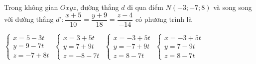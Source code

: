 \documentclass[12pt,a4paper]{article}
\begin{document}
\begin{ex}
 Trong không gian ${Oxyz}$, đường thẳng ${d}$ đi qua điểm ${N(-3;-7;8)}$ và song song với đường thẳng $d':\dfrac{x + 5}{10}=\dfrac{y + 9}{18}=\dfrac{z - 4}{-14}$ có phương trình là
 
\choice
{ $\left\{ \begin{array}{l}x = 5-3t\\ y = 9-7t\\z = -7+8t\end{array} \right.$ }
   { $\left\{ \begin{array}{l}x = 3+5t\\ y = 7+9t\\z = -8-7t\end{array} \right.$ }
     { \True $\left\{ \begin{array}{l}x = -3+5t\\ y = -7+9t\\z = 8-7t\end{array} \right.$ }
    { $\left\{ \begin{array}{l}x = -3+5t\\ y = 7-9t\\z = 8-7t\end{array} \right.$ }
\end{ex}
\end{document}
